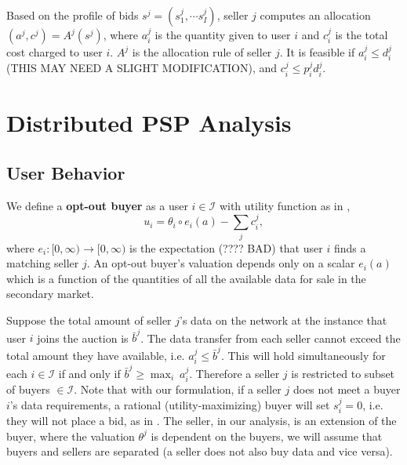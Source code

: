 \documentclass[12pt]{article}
\theoremstyle{definition}
\newcommand{\mcI}{\mathcal{I}}
\begin{document}
\begin{multicols}{2}
Based on the profile of bids $s^j = (s^j_1, \cdots s^j_I)$, seller $j$ computes
an allocation $(a^j, c^j) = A^j(s^j)$, where $a^j_i$ is the quantity given to
user $i$ and $c^j_i$ is the total cost charged to user $i$. $A^j$ is the
allocation rule of seller $j$. It is feasible if $a^j_i \le d_i^j$ (THIS MAY
NEED A SLIGHT MODIFICATION), and $c^j_i \le  p^j_i d_i^j$.

\section{Distributed PSP Analysis}
\subsection{User Behavior}

We define a \textbf{opt-out buyer} as a user $i\in\mcI$ with utility
function as in \cite{semret},
\begin{equation}\label{opt-utility}
    u_i = \theta_i \circ e_i(a) - \displaystyle\sum_j c_i^j,
\end{equation}
where $e_i : [0, \infty) \rightarrow [0,\infty)$ is the expectation 
(???? BAD) that user
$i$ finds a matching seller $j$. An opt-out buyer's valuation
depends only on a scalar $e_i(a)$ which is a function of the
quantities of all the available data for sale in the secondary market. 

Suppose the total amount of seller $j$'s data on the network at the instance that
user $i$ joins the auction is $\bar{b}^j$. 
The data transfer from each seller cannot exceed the total amount they have available,
i.e. $a_i^j \le \bar{b}^j$. This will hold simultaneously for each $i \in
\mcI$ if and only if $\bar{b}^j \ge \max_i \ a_i^j$. Therefore a seller $j$ is
restricted to subset of buyers $\in\mcI$.
Note that with our formulation, if a seller $j$ does not meet a buyer $i$'s data requirements, a
rational (utility-maximizing) buyer will set $s_i^j = 0$, i.e. they will not
place a bid, as in \cite{zheng}. The seller, in our analysis, is an extension of the buyer, where the valuation
$\theta^j$ is dependent on the buyers, we will assume that buyers and sellers
are separated (a seller does not also buy data and vice versa). 


\end{multicols}
\end{document}
